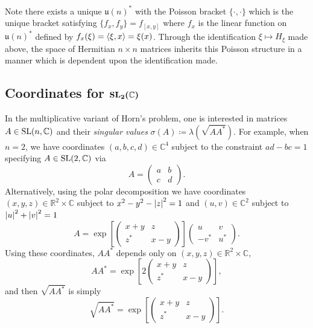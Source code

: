 \documentclass[notitlepage]{article}
\begin{document}
Note there exists a unique $\mathfrak u(n)^{*}$ with the Poisson bracket $\{\cdot, \cdot\}$ which is the unique bracket satisfying $\{f_x, f_y\} = f_{[x,y]}$ where $f_x$ is the linear function on $\mathfrak u(n)^{*}$ defined by $f_x(\xi) = \braket{\xi, x} = \xi(x)$.
Through the identification $\xi \mapsto H_\xi$ made above, the space of Hermitian $n\times n$ matrices inherits this Poisson structure in a manner which is dependent upon the identification made.

\subsection{Coordinates for \texorpdfstring{$\boldsymbol{\operatorname{SL}_2(\mathbb C)}$}{SL(2,C)}}

In the multiplicative variant of Horn's problem, one is interested in matrices $A \in \operatorname{SL}(n, \mathbb C)$ and their \textit{singular values} $\sigma(A) \coloneqq \lambda(\sqrt{A A^{*}})$.
For example, when $n = 2$, we have coordinates $(a,b,c,d) \in \mathbb C^{4}$ subject to the constraint $ad - bc = 1$ specifying $A \in \operatorname{SL}(2, \mathbb C)$ via
\begin{equation}
    A = \begin{pmatrix} a & b \\ c & d \end{pmatrix}.
\end{equation}
Alternatively, using the polar decomposition we have coordinates $(x,y,z) \in \mathbb R^{2} \times \mathbb C$ subject to $x^2 - y^2 - \left|z\right|^{2} = 1$ and $(u,v) \in \mathbb C^{2}$ subject to $\left|u\right|^{2}+\left|v\right|^{2} = 1$
\begin{equation}
    A = \exp\left[\begin{pmatrix} x+y & z \\ z^* & x-y \end{pmatrix}\right]\begin{pmatrix} u & v \\ -v^{*} & u^{*} \end{pmatrix}.
\end{equation}
Using these coordinates, $AA^{*}$ depends only on $(x,y,z) \in \mathbb R^{2} \times \mathbb C$,
\begin{equation}
    AA^{*} = \exp\left[2\begin{pmatrix} x+y & z \\ z^* & x-y \end{pmatrix}\right],
\end{equation}
and then $\sqrt{AA^{*}}$ is simply
\begin{equation}
    \sqrt{AA^{*}} = \exp\left[\begin{pmatrix} x+y & z \\ z^* & x-y \end{pmatrix}\right].
\end{equation}
\end{document}
